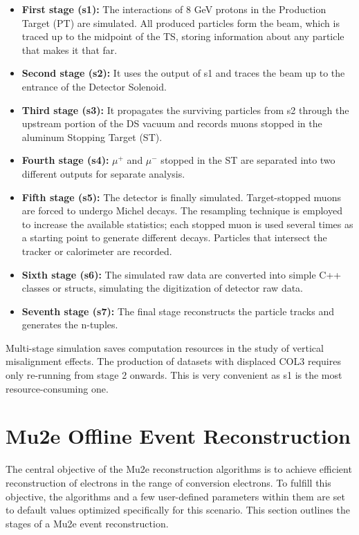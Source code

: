 \begin{itemize}
    \item \textbf{First stage (s1):} The interactions of 8 GeV protons in the Production Target (PT) 
    are simulated. All produced particles form the beam, which is traced up to the midpoint of the TS, 
    storing information about any particle that makes it that far.
    \item \textbf{Second stage (s2):} It uses the output of s1 and traces the beam up to the entrance 
    of the Detector Solenoid.
    \item \textbf{Third stage (s3):} It propagates the surviving particles from s2 through the 
    upstream portion of the DS vacuum and records muons stopped in the aluminum Stopping Target (ST).
    \item \textbf{Fourth stage (s4):} $\mu^+$ and $\mu^-$ stopped in the ST are separated into two 
    different outputs for separate analysis.
    \item \textbf{Fifth stage (s5):} The detector is finally simulated. Target-stopped muons are 
    forced to undergo Michel decays. The resampling technique is employed to increase the available 
    statistics; each stopped muon is used several times as a starting point to generate different 
    decays. Particles that intersect the tracker or calorimeter are recorded.
    \item \textbf{Sixth stage (s6):} The simulated raw data are converted into simple C++ classes 
    or structs, simulating the digitization of detector raw data.
    \item \textbf{Seventh stage (s7):} The final stage reconstructs the particle tracks and 
    generates the n-tuples.
\end{itemize}

Multi-stage simulation saves computation resources in the study of vertical misalignment 
effects. The production of datasets with displaced COL3 requires only re-running from stage 
2 onwards. This is very convenient as s1 is the most resource-consuming one.

\section{Mu2e Offline Event Reconstruction}

The central objective of the Mu2e reconstruction algorithms is to achieve efficient 
reconstruction of electrons in the range of conversion electrons. To fulfill this objective, 
the algorithms and a few user-defined parameters within them are set to default values optimized 
specifically for this scenario. This section outlines the stages of a Mu2e event reconstruction.

